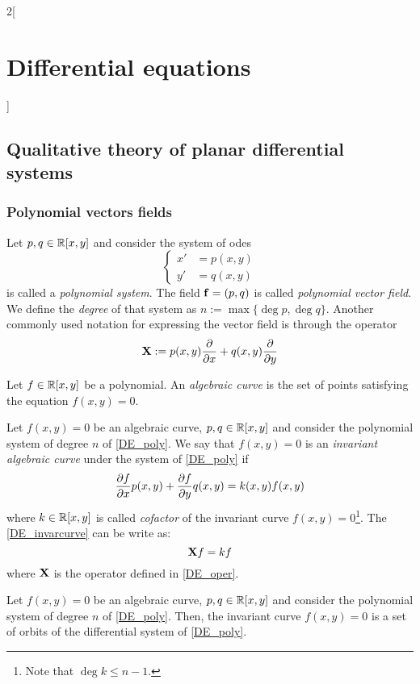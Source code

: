 \documentclass[../../../main.tex]{subfiles}
\begin{document}
\begin{multicols}{2}[\section{Differential equations}]
  \subsection{Qualitative theory of planar differential systems}
  \subsubsection{Polynomial vectors fields}
  \begin{definition}
    Let $p,q\in\mathbb{R}[x,y]$ and consider the system of odes
    \begin{equation}\label{DE_poly}
      \left\{
      \begin{aligned}
        x' & =p(x,y) \\
        y' & =q(x,y)
      \end{aligned}
      \right.
    \end{equation}
    is called a \emph{polynomial system}. The field $\boldsymbol{\mathrm{f}}=(p,q)$ is called \emph{polynomial vector field}. We define the \emph{degree} of that system as $n:=\max\{\deg p,\deg q\}$. Another commonly used notation for expressing the vector field is through the operator
    \begin{equation}\label{DE_oper}
      \boldsymbol{\mathrm{X}}:=p(x,y)\pdv{}{x}+q(x,y)\pdv{}{y}
    \end{equation}
  \end{definition}
  \begin{definition}
    Let $f\in\mathbb{R}[x,y]$ be a polynomial. An \emph{algebraic curve} is the set of points satisfying the equation $f(x,y)=0$.
  \end{definition}
  \begin{definition}
    Let $f(x,y)=0$ be an algebraic curve, $p,q\in\mathbb{R}[x,y]$ and consider the polynomial system of degree $n$ of \cref{DE_poly}. We say that $f(x,y)=0$ is an \emph{invariant algebraic curve} under the system of \cref{DE_poly} if
    \begin{equation}\label{DE_invarcurve}
      \pdv{f}{x}(x,y)p(x,y)+\pdv{f}{y}q(x,y)=k(x,y)f(x,y)
    \end{equation}
    where $k\in\mathbb{R}[x,y]$ is called \emph{cofactor} of the invariant curve $f(x,y)=0$\footnote{Note that $\deg k\leq n-1$.}. The \cref{DE_invarcurve} can be write as: $$\boldsymbol{\mathrm{X}}f=kf$$
    where $\boldsymbol{\mathrm{X}}$ is the operator defined in \cref{DE_oper}.
  \end{definition}
  \begin{proposition}
    Let $f(x,y)=0$ be an algebraic curve, $p,q\in\mathbb{R}[x,y]$ and consider the polynomial system of degree $n$ of \cref{DE_poly}. Then, the invariant curve $f(x,y)=0$ is a set of orbits of the differential system of \cref{DE_poly}.
  \end{proposition}

\end{multicols}
\end{document}
